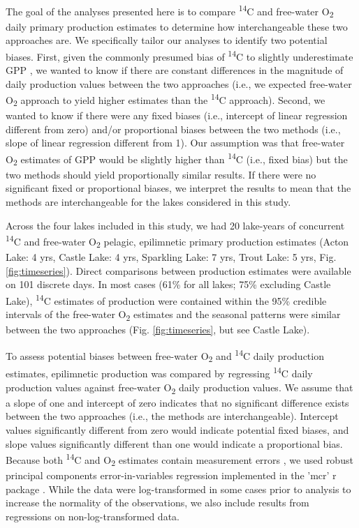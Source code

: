 \documentclass[12pt, oneside]{article}
\begin{document}
The goal of the analyses presented here is to compare \textsuperscript{14}C and free-water O\textsubscript{2} daily primary production estimates to determine how interchangeable these two approaches are. We specifically tailor our analyses to identify two potential biases. First, given the commonly presumed bias of \textsuperscript{14}C to slightly underestimate GPP \citep{peterson_aquatic_1980,hall_measuring_2007}, we wanted to know if there are constant differences in the magnitude of daily production values between the two approaches (i.e., we expected free-water O\textsubscript{2} approach to yield higher estimates than the \textsuperscript{14}C approach). Second, we wanted to know if there were any fixed biases (i.e., intercept of linear regression different from zero) and/or proportional biases between the two methods (i.e., slope of linear regression different from 1). Our assumption was that free-water O\textsubscript{2} estimates of GPP would be slightly higher than \textsuperscript{14}C (i.e., fixed bias) but the two methods should yield proportionally similar results. If there were no significant fixed or proportional biases, we interpret the results to mean that the methods are interchangeable for the lakes considered in this study.

Across the four lakes included in this study, we had 20 lake-years of concurrent \textsuperscript{14}C and free-water O\textsubscript{2} pelagic, epilimnetic primary production estimates (Acton Lake: 4 yrs, Castle Lake: 4 yrs, Sparkling Lake: 7 yrs, Trout Lake: 5 yrs, Fig. \ref{fig:timeseries}). Direct comparisons between production estimates were available on 101 discrete days. In most cases (61\% for all lakes; 75\% excluding Castle Lake), \textsuperscript{14}C estimates of production were contained within the 95\% credible intervals of the free-water O\textsubscript{2} estimates and the seasonal patterns were similar between the two approaches (Fig. \ref{fig:timeseries}, but see Castle Lake). 

To assess potential biases between free-water O\textsubscript{2} and \textsuperscript{14}C daily production estimates, epilimnetic production was compared by regressing \textsuperscript{14}C daily production values against free-water O\textsubscript{2} daily production values. We assume that a slope of one and intercept of zero indicates that no significant difference exists between the two approaches (i.e., the methods are interchangeable). Intercept values significantly different from zero would indicate potential fixed biases, and slope values significantly different than one would indicate a proportional bias. Because both \textsuperscript{14}C and O\textsubscript{2} estimates contain measurement errors \citep{macedo_annual_2001,pemberton_quantifying_2006,solomon_ecosystem_2013}, we used robust principal components error-in-variables regression \citep{passing_new_1983} implemented in the 'mcr' r package \citep{manuilova_mcr_2014}. While the data were log-transformed in some cases prior to analysis to increase the normality of the observations, we also include results from regressions on non-log-transformed data. 
\end{document}
